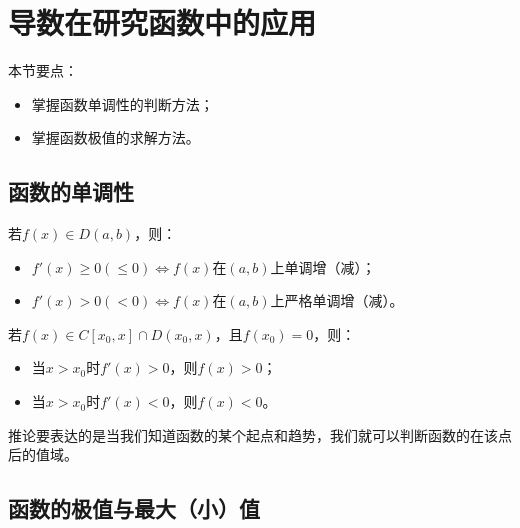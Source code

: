 \section{导数在研究函数中的应用}

本节要点：
\begin{itemize}
    \item 掌握函数单调性的判断方法；
    \item 掌握函数极值的求解方法。
\end{itemize}

\subsection{函数的单调性}

\begin{theorem}
若$f\left( x \right) \in D\left( a,b \right) $，则：
\begin{itemize}
    \item $f'\left( x \right) \geqslant 0\left( \leqslant 0 \right) \Leftrightarrow f\left( x \right) $在$\left( a,b \right) $上单调增（减）；
    \item $f'\left( x \right) >0\left( <0 \right) \Leftrightarrow f\left( x \right) $在$\left( a,b \right) $上严格单调增（减）。
\end{itemize}
\end{theorem}

\begin{corollary}
若$f\left( x \right) \in C\left[ x_0,x \right] \cap D\left( x_0,x \right) $，且$f\left( x_0 \right) =0$，则：
\begin{itemize}
    \item 当$x>x_0$时$f'\left( x \right) >0$，则$f\left( x \right) >0$；
    \item 当$x>x_0$时$f'\left( x \right) <0$，则$f\left( x \right) <0$。
\end{itemize}
\end{corollary}

推论要表达的是当我们知道函数的某个起点和趋势，我们就可以判断函数的在该点后的值域。

\subsection{函数的极值与最大（小）值}

